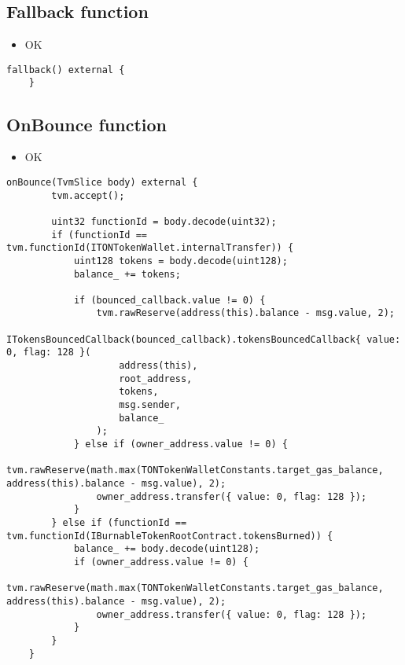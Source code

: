 \subsection{Fallback function}

\begin{itemize}
\item OK
\end{itemize}

\begin{lstlisting}[firstnumber=683]
    fallback() external {
    }
\end{lstlisting}

\subsection{OnBounce function}

\begin{itemize}
\item OK
\end{itemize}

\begin{lstlisting}[firstnumber=653]
    onBounce(TvmSlice body) external {
        tvm.accept();

        uint32 functionId = body.decode(uint32);
        if (functionId == tvm.functionId(ITONTokenWallet.internalTransfer)) {
            uint128 tokens = body.decode(uint128);
            balance_ += tokens;

            if (bounced_callback.value != 0) {
                tvm.rawReserve(address(this).balance - msg.value, 2);
                ITokensBouncedCallback(bounced_callback).tokensBouncedCallback{ value: 0, flag: 128 }(
                    address(this),
                    root_address,
                    tokens,
                    msg.sender,
                    balance_
                );
            } else if (owner_address.value != 0) {
                tvm.rawReserve(math.max(TONTokenWalletConstants.target_gas_balance, address(this).balance - msg.value), 2);
                owner_address.transfer({ value: 0, flag: 128 });
            }
        } else if (functionId == tvm.functionId(IBurnableTokenRootContract.tokensBurned)) {
            balance_ += body.decode(uint128);
            if (owner_address.value != 0) {
                tvm.rawReserve(math.max(TONTokenWalletConstants.target_gas_balance, address(this).balance - msg.value), 2);
                owner_address.transfer({ value: 0, flag: 128 });
            }
        }
    }
\end{lstlisting}

